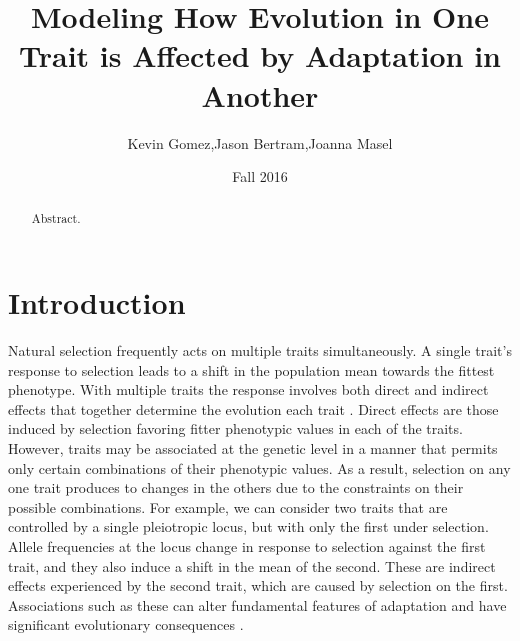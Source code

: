 \documentclass[11pt,twocolumn]{article}
\title{Modeling How Evolution in One Trait is Affected by Adaptation in Another}
\date{Fall 2016}
\author{Kevin Gomez,Jason Bertram,Joanna Masel}
\begin{document}
\maketitle
\newpage

\begin{abstract}
Abstract.
\end{abstract}

\section{Introduction}

Natural selection frequently acts on multiple traits simultaneously. A single trait's response to selection leads to a shift in the population mean towards the fittest phenotype. With multiple traits the response involves both direct and indirect effects that together determine the evolution each trait \citep{lande1983measurement,Lovell2013,Wagner2011}. Direct effects are those induced by selection favoring fitter phenotypic values in each of the traits.  However, traits may be associated at the genetic level in a manner that permits only certain combinations of their phenotypic values.  As a result, selection on any one trait produces to changes in the others due to the constraints on their possible combinations. For example, we can consider two traits that are controlled by a single pleiotropic locus, but with only the first under selection. Allele frequencies at the locus change in response to selection against the first trait, and they also induce a shift in the mean of the second. These are indirect effects experienced by the second trait, which are caused by selection on the first.  Associations such as these can alter fundamental features of adaptation and have significant evolutionary consequences \citep{Felsenstein1979, Arnold2001, Arnold2008}.\par
% 
% 
% 
% 
% 
\end{document}
